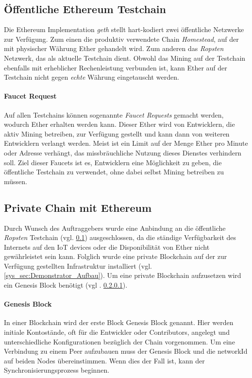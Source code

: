 \subsection{Öffentliche Ethereum Testchain}
\label{subsec:oeffentliche_testchain}
Die Ethereum Implementation \emph{geth} stellt hart-kodiert zwei öffentliche Netzwerke zur Verfügung. Zum einen die produktiv verwendete Chain \emph{Homestead}, auf der mit physischer Währung Ether gehandelt wird. Zum anderen das \emph{Ropsten} Netzwerk, das als aktuelle Testchain dient. Obwohl das Mining auf der Testchain ebenfalls mit erheblicher Rechenleistung verbunden ist, kann Ether auf der Testchain nicht gegen \emph{echte} Währung eingetauscht werden.\cite[{Ether}]{ethereum-homestead.readthedocs.io}

\paragraph{Faucet Request}
\label{para:Faucet_Request}
Auf allen Testchains können sogenannte \emph{Faucet Requests} gemacht werden, wodurch Ether erhalten werden kann. Dieser Ether wird von Entwicklern, die aktiv Mining betreiben, zur Verfügung gestellt und kann dann von weiteren Entwicklern verlangt werden. Meist ist ein Limit auf der Menge Ether pro Minute oder Adresse verhängt, das missbräuchliche Nutzung dieses Dienstes verhindern soll. Ziel dieser Faucets ist es, Entwicklern eine Möglichkeit zu geben, die öffentliche Testchain zu verwendet, ohne dabei selbst Mining betreiben zu müssen.\cite{blog.b9lab.com/faucet,ethereum.stackexchange.com/faucets}

\subsection{Private Chain mit Ethereum}
\label{subsec:private_chain}
Durch Wunsch des Auftraggebers wurde eine Anbindung an die öffentliche \emph{Ropsten} Testchain (vgl. \ref{subsec:oeffentliche_testchain}) ausgeschlossen, da die ständige Verfügbarkeit des Internets auf den IoT devices oder die Disponibilität von Ether nicht gewährleistet sein kann. Folglich wurde eine private Blockchain auf der zur Verfügung gestellten Infrastruktur installiert (vgl. \ref{sys_sec:Demonstrator_Aufbau}). Um eine private Blockchain aufzusetzen wird ein Genesis Block benötigt (vgl . \ref{re_para:Genesis_Block}).

\paragraph{Genesis Block}
\label{re_para:Genesis_Block}
In einer Blockchain wird der erste Block Genesis Block genannt. Hier werden initiale Kontostände, oft für die Entwickler oder Contributors, angelegt und unterschiedliche Konfigurationen bezüglich der Chain vorgenommen.
Um eine Verbindung zu einem Peer aufzubauen muss der Genesis Block und die networkId auf beiden Nodes übereinstimmen. Wenn dies der Fall ist, kann der Synchronisierungsprozess beginnen.

